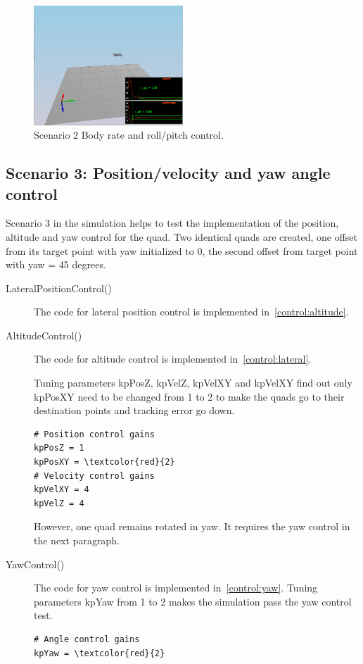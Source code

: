 \documentclass[a4paper]{article}
\begin{document}
\begin{figure}[ht]
\centering
\includegraphics[width=0.5\textwidth]{./fig/scenario2.png}
\caption{\label{fig:scenario2} Scenario 2 Body rate and roll/pitch control.}
\end{figure}

\subsection{Scenario 3: Position/velocity and yaw angle control}

Scenario 3 in the simulation helps to test the implementation of the position, altitude and yaw control for the quad. Two identical quads are created, one offset from its target point with yaw initialized to 0, the second offset from target point with yaw = 45 degrees.

\begin{description}
\item [LateralPositionControl()] The code for lateral position  control is implemented in~\ref{control:altitude}. 

\item [AltitudeControl()] The code for altitude control is implemented in~\ref{control:lateral}. 

Tuning parameters kpPosZ, kpVelZ, kpVelXY and kpVelXY find out only kpPosXY need to be changed from 1 to 2 to make the quads go to their destination points and tracking error go down. 

\begin{Verbatim}[frame=single,commandchars=\\\{\}]
# Position control gains
kpPosZ = 1
kpPosXY = \textcolor{red}{2}
# Velocity control gains
kpVelXY = 4
kpVelZ = 4
\end{Verbatim} 

However, one quad remains rotated in yaw. It requires the yaw control in the next paragraph. 

\item [YawControl()] The code for yaw control is implemented in~\ref{control:yaw}. Tuning parameters kpYaw from 1 to 2 makes the simulation pass the yaw control test.

\begin{Verbatim}[frame=single,commandchars=\\\{\}]
# Angle control gains
kpYaw = \textcolor{red}{2}
\end{Verbatim} 

\end{description}
\end{document}
